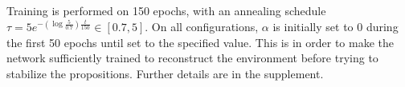 % 
% 
% 
% 


Training is performed on 150 epochs, with an annealing schedule
$\tau=5e^{- (\log\frac{5}{0.7})\frac{t}{150}}\in [0.7,5]$.
On all configurations, $\alpha$ is initially set to 0 during the first 50 epochs until set to the specified value.
This is in order to make the network sufficiently trained to
reconstruct the environment before trying to stabilize the propositions.
Further details are in the supplement.


